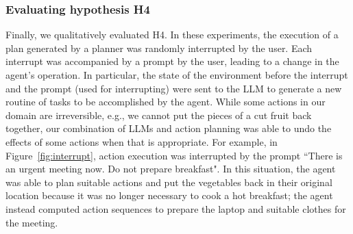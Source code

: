 \subsubsection{Evaluating hypothesis H4}
Finally, we qualitatively evaluated H4. In these experiments, the execution of a plan generated by a planner was randomly interrupted by the user. Each interrupt was accompanied by a prompt by the user, leading to a change in the agent's operation. In particular, the state of the environment before the interrupt and the prompt (used for interrupting) were sent to the LLM to generate a new routine of tasks to be accomplished by the agent. While some actions in our domain are irreversible, e.g., we cannot put the pieces of a cut fruit back together, our combination of LLMs and action planning was able to undo the effects of some actions when that is appropriate. For example, in Figure~\ref{fig:interrupt}, action execution was interrupted by the prompt ``There is an urgent meeting now. Do not prepare breakfast". In this situation, the agent was able to plan suitable actions and put the vegetables back in their original location because it was no longer necessary to cook a hot breakfast; the agent instead computed action sequences to prepare the laptop and suitable clothes for the meeting.



